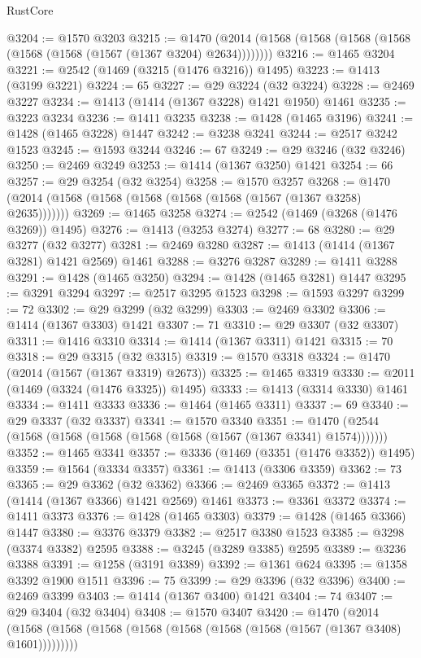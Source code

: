 \begin{lexlean}{RustCore}
\begin{coremodule}
@3204 := @1570 @3203
@3215 := @1470 (@2014 (@1568 (@1568 (@1568 (@1568 (@1568 (@1568 (@1567 (@1367 @3204) @2634))))))))
@3216 := @1465 @3204
@3221 := @2542 (@1469 (@3215 (@1476 @3216)) @1495)
@3223 := @1413 (@3199 @3221)
@3224 := 65
@3227 := @29 @3224 (@32 @3224)
@3228 := @2469 @3227
@3234 := @1413 (@1414 (@1367 @3228) @1421 @1950) @1461
@3235 := @3223 @3234
@3236 := @1411 @3235
@3238 := @1428 (@1465 @3196)
@3241 := @1428 (@1465 @3228) @1447
@3242 := @3238 @3241
@3244 := @2517 @3242 @1523
@3245 := @1593 @3244
@3246 := 67
@3249 := @29 @3246 (@32 @3246)
@3250 := @2469 @3249
@3253 := @1414 (@1367 @3250) @1421
@3254 := 66
@3257 := @29 @3254 (@32 @3254)
@3258 := @1570 @3257
@3268 := @1470 (@2014 (@1568 (@1568 (@1568 (@1568 (@1568 (@1567 (@1367 @3258) @2635)))))))
@3269 := @1465 @3258
@3274 := @2542 (@1469 (@3268 (@1476 @3269)) @1495)
@3276 := @1413 (@3253 @3274)
@3277 := 68
@3280 := @29 @3277 (@32 @3277)
@3281 := @2469 @3280
@3287 := @1413 (@1414 (@1367 @3281) @1421 @2569) @1461
@3288 := @3276 @3287
@3289 := @1411 @3288
@3291 := @1428 (@1465 @3250)
@3294 := @1428 (@1465 @3281) @1447
@3295 := @3291 @3294
@3297 := @2517 @3295 @1523
@3298 := @1593 @3297
@3299 := 72
@3302 := @29 @3299 (@32 @3299)
@3303 := @2469 @3302
@3306 := @1414 (@1367 @3303) @1421
@3307 := 71
@3310 := @29 @3307 (@32 @3307)
@3311 := @1416 @3310
@3314 := @1414 (@1367 @3311) @1421
@3315 := 70
@3318 := @29 @3315 (@32 @3315)
@3319 := @1570 @3318
@3324 := @1470 (@2014 (@1567 (@1367 @3319) @2673))
@3325 := @1465 @3319
@3330 := @2011 (@1469 (@3324 (@1476 @3325)) @1495)
@3333 := @1413 (@3314 @3330) @1461
@3334 := @1411 @3333
@3336 := @1464 (@1465 @3311)
@3337 := 69
@3340 := @29 @3337 (@32 @3337)
@3341 := @1570 @3340
@3351 := @1470 (@2544 (@1568 (@1568 (@1568 (@1568 (@1568 (@1567 (@1367 @3341) @1574)))))))
@3352 := @1465 @3341
@3357 := @3336 (@1469 (@3351 (@1476 @3352)) @1495)
@3359 := @1564 (@3334 @3357)
@3361 := @1413 (@3306 @3359)
@3362 := 73
@3365 := @29 @3362 (@32 @3362)
@3366 := @2469 @3365
@3372 := @1413 (@1414 (@1367 @3366) @1421 @2569) @1461
@3373 := @3361 @3372
@3374 := @1411 @3373
@3376 := @1428 (@1465 @3303)
@3379 := @1428 (@1465 @3366) @1447
@3380 := @3376 @3379
@3382 := @2517 @3380 @1523
@3385 := @3298 (@3374 @3382) @2595
@3388 := @3245 (@3289 @3385) @2595
@3389 := @3236 @3388
@3391 := @1258 (@3191 @3389)
@3392 := @1361 @624
@3395 := @1358 @3392 @1900 @1511
@3396 := 75
@3399 := @29 @3396 (@32 @3396)
@3400 := @2469 @3399
@3403 := @1414 (@1367 @3400) @1421
@3404 := 74
@3407 := @29 @3404 (@32 @3404)
@3408 := @1570 @3407
@3420 := @1470
    (@2014 (@1568 (@1568 (@1568 (@1568 (@1568 (@1568 (@1568 (@1567 (@1367 @3408) @1601)))))))))

\end{coremodule}
\end{lexlean}
